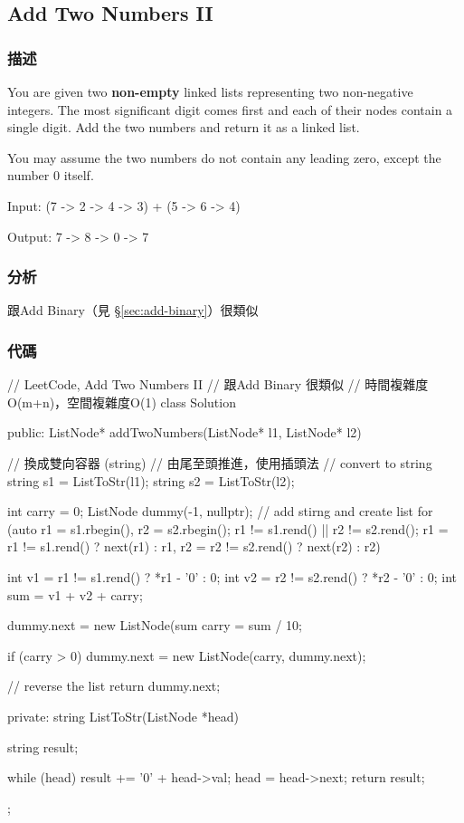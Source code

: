\subsection{Add Two Numbers II}
\label{sec:add-two-numbers-ii}


\subsubsection{描述}
You are given two \textbf{non-empty} linked lists representing two non-negative integers. The most significant digit comes first and each of their nodes contain a single digit. Add the two numbers and return it as a linked list.

You may assume the two numbers do not contain any leading zero, except the number 0 itself.


Input: {\small {} (7 -> 2 -> 4 -> 3) + (5 -> 6 -> 4)}

Output: {\small {} 7 -> 8 -> 0 -> 7}


\subsubsection{分析}
跟Add Binary（見 \S \ref{sec:add-binary}）很類似


\subsubsection{代碼}
\begin{Code}
// LeetCode, Add Two Numbers II
// 跟Add Binary 很類似
// 時間複雜度O(m+n)，空間複雜度O(1)
class Solution {
public:
    ListNode* addTwoNumbers(ListNode* l1, ListNode* l2) {
        // 換成雙向容器 (string)
        // 由尾至頭推進，使用插頭法
        // convert to string
        string s1 = ListToStr(l1);
        string s2 = ListToStr(l2);

        int carry = 0;
        ListNode dummy(-1, nullptr);
        // add stirng and create list
        for (auto r1 = s1.rbegin(), r2 = s2.rbegin();
             r1 != s1.rend() || r2 != s2.rend();
             r1 = r1 != s1.rend() ? next(r1) : r1, r2 = r2 != s2.rend() ? next(r2) : r2)
        {
            int v1 = r1 != s1.rend() ? *r1 - '0' : 0;
            int v2 = r2 != s2.rend() ? *r2 - '0' : 0;
            int sum = v1 + v2 + carry;

            dummy.next = new ListNode(sum %
            carry = sum / 10;
        }
        if (carry > 0)
            dummy.next = new ListNode(carry, dummy.next);

        // reverse the list
        return dummy.next;
    }
private:
    string ListToStr(ListNode *head)
    {
        string result;

        while (head)
        {
            result += '0' + head->val;
            head = head->next;
        }
        return result;
    }
};
\end{Code}



